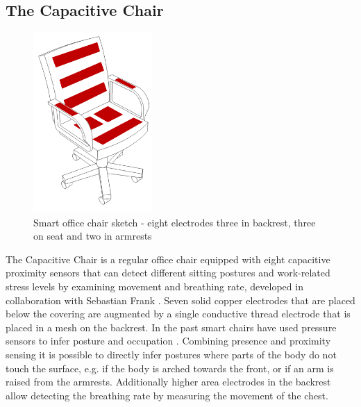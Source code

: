 \subsection{The Capacitive Chair}
\label{ch:prot_capchair}
\begin{figure}[h]
\centering
\includegraphics[width=0.4\textwidth]{images/smartofficechair}
\caption{Smart office chair sketch - eight electrodes three in backrest, three on seat and two in armrests}
\label{fig:smartchair_sketch}
\end{figure}
The Capacitive Chair is a regular office chair equipped with eight capacitive proximity sensors that can detect different sitting postures and work-related stress levels by examining movement and breathing rate, developed in collaboration with Sebastian Frank \cite{Braun2013ChairAid}. Seven solid copper electrodes that are placed below the covering are augmented by a single conductive thread electrode that is placed in a mesh on the backrest. In the past smart chairs have used pressure sensors to infer posture and occupation \cite{tan2001sensing}. Combining presence and proximity sensing it is possible to directly infer postures where parts of the body do not touch the surface, e.g. if the body is arched towards the front, or if an arm is raised from the armrests. Additionally higher area electrodes in the backrest allow detecting the breathing rate by measuring the movement of the chest.

